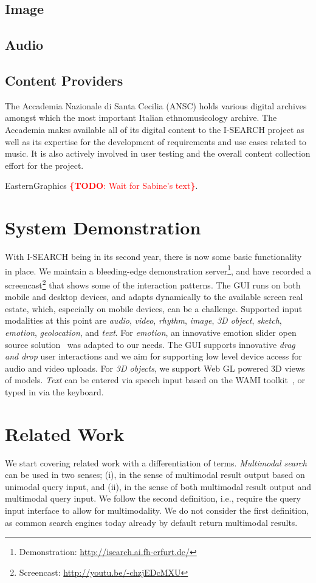 \documentclass{acm_proc_article-sp}
\let\oldemph\emph
\renewcommand{\emph}[1]{\oldemph{\fontsize{9}{9}\selectfont #1}}
\newcommand{\todo}[1]{\noindent\textcolor{red}{{\bf \{TODO}: #1{\bf \}}}}
\newcommand{\inlinelistingsize}{\fontsize{8pt}{11pt}}
\let\oldurl\url
\renewcommand{\url}[1]{\inlinelistingsize\oldurl{#1}}
\begin{document}
\subsection{Image} 

\subsection{Audio}

\subsection{Content Providers}
The Accademia Nazionale di Santa Cecilia (ANSC) holds various digital archives amongst which the most important Italian ethnomusicology archive.
The Accademia makes available all of its digital content to the \mbox{I-SEARCH} project as well as its expertise for the development of requirements and use cases related to music.
It is also actively involved in user testing and the overall content collection effort for the project.

EasternGraphics \todo{Wait for Sabine's text}.

\section{System Demonstration} \label{sec:systemdemonstration}
With \mbox{I-SEARCH} being in its second year, there is now some basic functionality in place.
We maintain a bleeding-edge demonstration server\footnote{Demonstration: \url{http://isearch.ai.fh-erfurt.de/}}, and have recorded a screencast\footnote{Screencast: \url{http://youtu.be/-chzjEDcMXU}} that shows some of the interaction patterns.
The GUI runs on both mobile and desktop devices, and adapts dynamically to the available screen real estate, which, especially on mobile devices, can be a challenge.
Supported input modalities at this point are \emph{audio}, \emph{video}, \emph{rhythm}, \emph{image}, \emph{3D object}, \emph{sketch}, \emph{emotion}, \emph{geolocation}, and \emph{text}.
For \emph{emotion}, an innovative emotion slider open source solution~\cite{emotionslider} was adapted to our needs.
The GUI supports innovative \textit{drag and drop} user interactions and we aim for supporting low level device access for audio and video uploads.
For \emph{3D objects}, we support Web GL powered 3D views of models.
\emph{Text} can be entered via speech input based on the WAMI toolkit~\cite{wami}, or typed in via the keyboard.

\section{Related Work} \label{sec:relatedwork}
We start covering related work with a differentiation of terms.
\emph{Multimodal search} can be used in two senses; (i), in the sense of multimodal result output based on unimodal query input, and (ii), in the sense of both multimodal result output and multimodal query input.
We follow the second definition, i.e., require the query input interface to allow for multimodality.
We do not consider the first definition, as common search engines today already by default return multimodal results.
\end{document}
